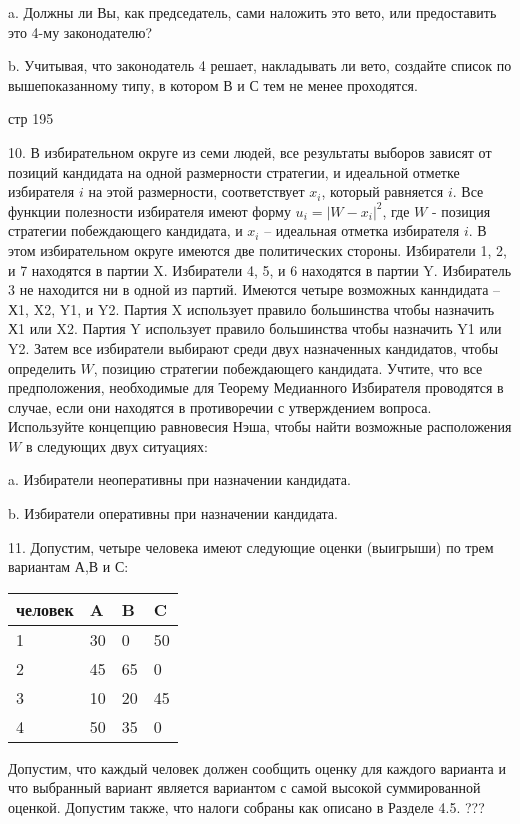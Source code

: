 \documentclass[a4paper,12pt]{article}
\begin{document}
a. Должны ли Вы, как председатель, сами наложить
это вето, или предоставить это 4-му законодателю?

b. Учитывая, что законодатель 4 решает, накладывать
ли вето, создайте список по вышепоказанному типу, в
котором В и С тем не менее проходятся.

стр 195

10. В избирательном округе из семи людей, все
результаты выборов зависят от позиций кандидата на
одной размерности стратегии, и идеальной отметке
избирателя $i$ на этой размерности, соответствует
$x_{i} $, который равняется $i$. Все функции
полезности избирателя имеют форму $u_{i}=\left\vert
W-x_{i}\right\vert ^{2}$, где $W$ - позиция
стратегии побеждающего кандидата, и $x_{i}$ --
идеальная отметка избирателя $i$. В этом
избирательном округе имеются две политических
стороны. Избиратели 1, 2, и 7 находятся в партии X.
Избиратели 4, 5, и 6 находятся в партии Y.
Избиратель 3 не находится ни в одной из партий.
Имеются четыре возможных канндидата -- Х1, X2, Y1,
и Y2. Партия X использует правило большинства чтобы
назначить Х1 или X2. Партия Y использует правило
большинства чтобы назначить Y1 или Y2. Затем все
избиратели выбирают среди двух назначенных
кандидатов, чтобы определить $W$, позицию стратегии
побеждающего кандидата. Учтите, что все
предположения, необходимые для Теорему Медианного
Избирателя проводятся в случае, если они находятся
в противоречии с утверждением вопроса. Используйте
концепцию равновесия Нэша, чтобы найти возможные
расположения $W$ в следующих двух ситуациях:

a. Избиратели неоперативны при назначении
кандидата.

b. Избиратели оперативны при назначении кандидата.

11. Допустим, четыре человека имеют следующие
оценки (выигрыши) по трем вариантам А,В и С:

\begin{tabular}{|l|l|l|l|}
\hline человек & A & B & C \\ \hline
1 & 30 & 0 & 50 \\ 2 & 45 & 65 & 0 \\ 3 & 10 & 20 & 45 \\
4 & 50 & 35 & 0 \\ \hline
\end{tabular}

Допустим, что каждый человек должен сообщить оценку
для каждого варианта и что выбранный вариант
является вариантом с самой высокой суммированной
оценкой. Допустим также, что налоги собраны как
описано в Разделе 4.5. ???
\end{document}
